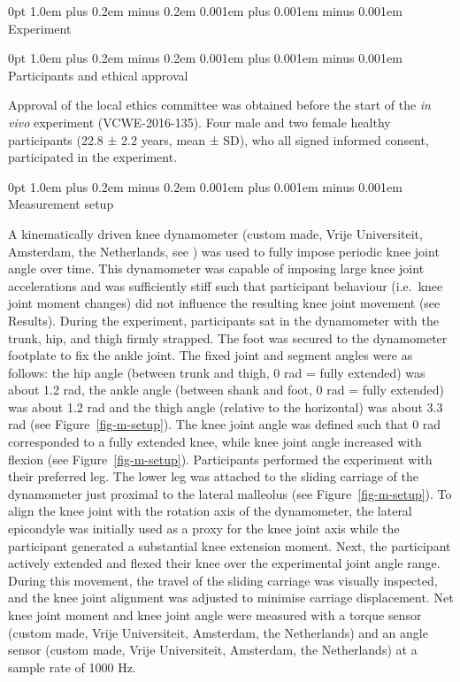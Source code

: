 \documentclass[
  11pt,
  a4paper]{article}
\makeatletter
\renewcommand{\subsection}{%
  \@startsection{subsection}{2}
    {0pt} 					%
    {1.0em plus 0.2em minus 0.2em} 	%
    {0.001em plus 0.001em minus 0.001em}    	%
    {\large\bfseries\sffamily}%
}
\renewcommand{\subsubsection}{%
  \@startsection{subsubsection}{3}
    {0pt} 					%
    {1.0em plus 0.2em minus 0.2em} 	%
    {0.001em plus 0.001em minus 0.001em}    	%
    {\normalsize\bfseries\sffamily}%
}
\makeatother
\begin{document}
\subsection{Experiment}\label{experiment}

\subsubsection{Participants and ethical
approval}\label{participants-and-ethical-approval}

Approval of the local ethics committee was obtained before the start of
the \emph{in vivo} experiment (VCWE-2016-135). Four male and two female
healthy participants (22.8 ± 2.2 years, mean ± SD), who all signed
informed consent, participated in the experiment.

\subsubsection{Measurement setup}\label{sec-m-setup}

A kinematically driven knee dynamometer (custom made, Vrije
Universiteit, Amsterdam, the Netherlands, see
) was used to
fully impose periodic knee joint angle over time. This dynamometer was
capable of imposing large knee joint accelerations and was sufficiently
stiff such that participant behaviour (i.e.~knee joint moment changes)
did not influence the resulting knee joint movement (see Results).
During the experiment, participants sat in the dynamometer with the
trunk, hip, and thigh firmly strapped. The foot was secured to the
dynamometer footplate to fix the ankle joint. The fixed joint and
segment angles were as follows: the hip angle (between trunk and thigh,
0 rad = fully extended) was about 1.2 rad, the ankle angle (between
shank and foot, 0 rad = fully extended) was about 1.2 rad and the thigh
angle (relative to the horizontal) was about 3.3 rad (see
Figure~\ref{fig-m-setup}). The knee joint angle was defined such that 0
rad corresponded to a fully extended knee, while knee joint angle
increased with flexion (see Figure~\ref{fig-m-setup}). Participants
performed the experiment with their preferred leg. The lower leg was
attached to the sliding carriage of the dynamometer just proximal to the
lateral malleolus (see Figure~\ref{fig-m-setup}). To align the knee
joint with the rotation axis of the dynamometer, the lateral epicondyle
was initially used as a proxy for the knee joint axis while the
participant generated a substantial knee extension moment. Next, the
participant actively extended and flexed their knee over the
experimental joint angle range. During this movement, the travel of the
sliding carriage was visually inspected, and the knee joint alignment
was adjusted to minimise carriage displacement. Net knee joint moment
and knee joint angle were measured with a torque sensor (custom made,
Vrije Universiteit, Amsterdam, the Netherlands) and an angle sensor
(custom made, Vrije Universiteit, Amsterdam, the Netherlands) at a
sample rate of 1000 Hz.
\end{document}
